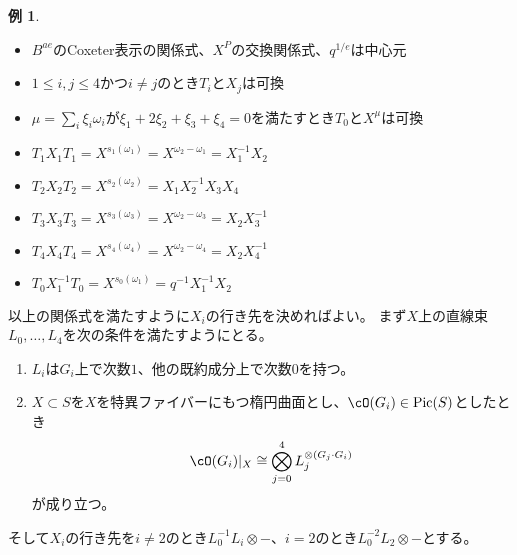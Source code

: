 \documentclass[uplatex, a4paper, dvipdfmx]{jsarticle}
\theoremstyle{definition}
\newtheorem{example}[theorem]{例}
\DeclareMathOperator{\Pic}{\mathrm{Pic}}
\begin{document}
\begin{example}
    \begin{itemize}
        \item $B^{ae}$のCoxeter表示の関係式、$X^P$の交換関係式、$q^{1/e}$は中心元
        \item $1\leq i, j \leq 4$かつ$i \neq j$のとき$T_i$と$X_j$は可換
        \item $\mu = \sum_i \xi_i \omega_i$が$\xi_1 + 2\xi_2 + \xi_3 + \xi_4 = 0$を満たすとき$T_0$と$X^\mu$は可換
        \item $T_1X_1T_1 = X^{s_1(\omega_1)} = X^{\omega_2-\omega_1} = X_1^{-1}X_2$
        \item $T_2X_2T_2 = X^{s_2(\omega_2)} = X_1X_2^{-1}X_3X_4$
        \item $T_3X_3T_3 = X^{s_3(\omega_3)} = X^{\omega_2-\omega_3} = X_2X_3^{-1}$
        \item $T_4X_4T_4 = X^{s_4(\omega_4)} = X^{\omega_2-\omega_4} = X_2X_4^{-1}$
        \item $T_0X_1^{-1}T_0 = X^{s_0(\omega_1)} = q^{-1}X_1^{-1}X_2$
    \end{itemize}
    以上の関係式を満たすように$X_i$の行き先を決めればよい。
    まず$X$上の直線束$L_0, \dots, L_4$を次の条件を満たすようにとる。
    \begin{enumerate}
        \item $L_i$は$G_i$上で次数$1$、他の既約成分上で次数$0$を持つ。
        \item $X \subset S$を$X$を特異ファイバーにもつ楕円曲面とし、$\cO(G_i) \in \Pic(S)$としたとき
              \begin{equation}
                  \cO(G_i)\vert_X \cong \bigotimes_{j=0}^4 L_j^{\otimes (G_j\cdot G_i)}
              \end{equation}
              が成り立つ。
    \end{enumerate}
    そして$X_i$の行き先を$i \neq 2$のとき$L_0^{-1}L_i \otimes-$、$i=2$のとき$L_0^{-2}L_2 \otimes -$とする。
\end{example}
\printbibliography[title=参考文献]
\end{document}
